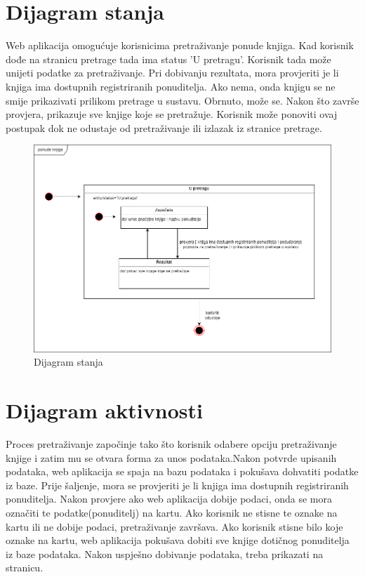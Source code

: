 		\section{Dijagram stanja}
			
			
			
			Web aplikacija omogućuje korisnicima pretraživanje ponude knjiga. Kad korisnik dođe na stranicu pretrage tada ima status 'U pretragu'. Korisnik tada može unijeti podatke za pretraživanje. Pri dobivanju rezultata, mora provjeriti je li knjiga ima dostupnih registriranih ponuditelja. Ako nema, onda knjigu se ne smije prikazivati prilikom pretrage u sustavu. Obrnuto, može se. Nakon što završe provjera, prikazuje sve knjige koje se pretražuje. Korisnik može ponoviti ovaj postupak dok ne odustaje od pretraživanje ili izlazak iz stranice pretrage.
			
			\begin{figure}[H]
				\includegraphics[scale=0.4]{slike/4.3 dijagram stanja.png} %
				\centering
				\caption{Dijagram stanja}
				\label{fig:DijStanja}
			\end{figure}
			
			
			\eject 
		
		\section{Dijagram aktivnosti}
			
			
			 Proces pretraživanje započinje tako što korisnik odabere opciju pretraživanje knjige i zatim mu se otvara forma za unos podataka.Nakon potvrde upisanih podataka, web aplikacija se spaja na bazu podataka i pokušava dohvatiti podatke iz baze. Prije šaljenje, mora se provjeriti je li knjiga ima dostupnih registriranih ponuditelja. Nakon provjere ako web aplikacija dobije podaci, onda se mora označiti te podatke(ponuditelj) na kartu. Ako korisnik ne stisne te oznake na kartu ili ne dobije podaci, pretraživanje završava. Ako korisnik stisne bilo koje oznake na kartu, web aplikacija pokušava dobiti sve knjige dotičnog ponuditelja iz baze podataka. Nakon uspješno dobivanje podataka, treba prikazati na stranicu.
			 
